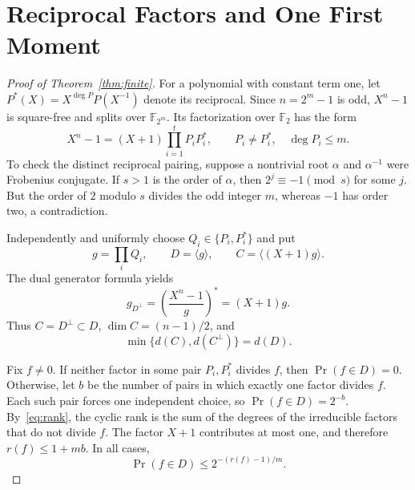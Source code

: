\documentclass[12pt,letterpaper,onecolumn]{article}
\theoremstyle{remark}
\newcommand{\F}{\mathbb F}
\newcommand{\rkcyc}{r}
\begin{document}
\section{Reciprocal Factors and One First Moment}
\begin{proof}[Proof of Theorem~\ref{thm:finite}]
For a polynomial with constant term one, let $P^*(X)=X^{\deg P}P(X^{-1})$ denote its reciprocal. Since $n=2^m-1$ is odd, $X^n-1$ is square-free and splits over $\F_{2^m}$. Its factorization over $\F_2$ has the form
\begin{equation}
 X^n-1=(X+1)\prod_{i=1}^{t}P_iP_i^*,
 \qquad P_i\ne P_i^*,\quad \deg P_i\le m.
 \label{eq:factorization}
\end{equation}
To check the distinct reciprocal pairing, suppose a nontrivial root $\alpha$ and $\alpha^{-1}$ were Frobenius conjugate. If $s>1$ is the order of $\alpha$, then $2^j\equiv-1\pmod s$ for some $j$. But the order of $2$ modulo $s$ divides the odd integer $m$, whereas $-1$ has order two, a contradiction.

Independently and uniformly choose $Q_i\in\{P_i,P_i^*\}$ and put
\[
 g=\prod_iQ_i,\qquad D=\langle g\rangle,
 \qquad C=\langle(X+1)g\rangle.
\]
The dual generator formula yields
\[
 g_{D^\perp}=\left(\frac{X^n-1}{g}\right)^*=(X+1)g.
\]
Thus $C=D^\perp\subset D$, $\dim C=(n-1)/2$, and
\begin{equation}
 \min\{d(C),d(C^\perp)\}=d(D).
 \label{eq:both}
\end{equation}

Fix $f\ne0$. If neither factor in some pair $P_i,P_i^*$ divides $f$, then $\Pr(f\in D)=0$. Otherwise, let $b$ be the number of pairs in which exactly one factor divides $f$. Each such pair forces one independent choice, so $\Pr(f\in D)=2^{-b}$. By~\eqref{eq:rank}, the cyclic rank is the sum of the degrees of the irreducible factors that do not divide $f$. The factor $X+1$ contributes at most one, and therefore $\rkcyc(f)\le1+mb$. In all cases,
\begin{equation}
 \Pr(f\in D)\le2^{-(\rkcyc(f)-1)/m}.
 \label{eq:inclusion}
\end{equation}


\end{proof}
\end{document}
